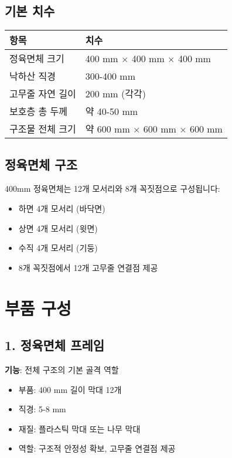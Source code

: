 \documentclass[a4paper,12pt]{article}
\begin{document}
\begin{CJK}{UTF8}{mj}
\subsection{기본 치수}

\begin{center}
\begin{tabular}{ll}
\toprule
\textbf{항목} & \textbf{치수} \\
\midrule
정육면체 크기 & 400 mm $\times$ 400 mm $\times$ 400 mm \\
낙하산 직경 & 300-400 mm \\
고무줄 자연 길이 & 200 mm (각각) \\
보호층 총 두께 & 약 40-50 mm \\
구조물 전체 크기 & 약 600 mm $\times$ 600 mm $\times$ 600 mm \\
\bottomrule
\end{tabular}
\end{center}

\subsection{정육면체 구조}

400mm 정육면체는 12개 모서리와 8개 꼭짓점으로 구성됩니다:

\begin{itemize}
    \item 하면 4개 모서리 (바닥면)
    \item 상면 4개 모서리 (윗면)
    \item 수직 4개 모서리 (기둥)
    \item 8개 꼭짓점에서 12개 고무줄 연결점 제공
\end{itemize}

\section{부품 구성}

\subsection{1. 정육면체 프레임}

\textbf{기능}: 전체 구조의 기본 골격 역할

\begin{itemize}
    \item 부품: 400 mm 길이 막대 12개
    \item 직경: 5-8 mm
    \item 재질: 플라스틱 막대 또는 나무 막대
    \item 역할: 구조적 안정성 확보, 고무줄 연결점 제공
\end{itemize}


\end{CJK}
\end{document}
